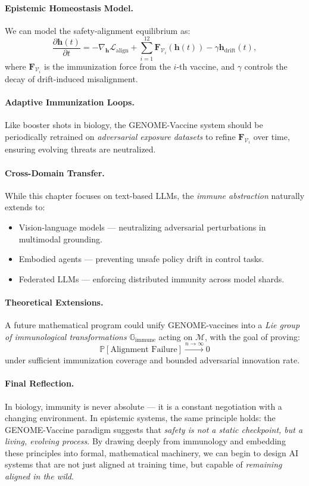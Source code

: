 \paragraph{Epistemic Homeostasis Model.}  
We can model the safety-alignment equilibrium as:
\[
\frac{\partial \mathbf{h}(t)}{\partial t} = -\nabla_{\mathbf{h}} \mathcal{L}_\mathrm{align} + \sum_{i=1}^{12} \mathbf{F}_{\mathcal{V}_i}(\mathbf{h}(t)) - \gamma \mathbf{h}_\mathrm{drift}(t),
\]
where $\mathbf{F}_{\mathcal{V}_i}$ is the immunization force from the $i$-th vaccine, and $\gamma$ controls the decay of drift-induced misalignment.

\paragraph{Adaptive Immunization Loops.}  
Like booster shots in biology, the GENOME-Vaccine system should be periodically retrained on \emph{adversarial exposure datasets} to refine $\mathbf{F}_{\mathcal{V}_i}$ over time, ensuring evolving threats are neutralized.

\paragraph{Cross-Domain Transfer.}  
While this chapter focuses on text-based LLMs, the \emph{immune abstraction} naturally extends to:
\begin{itemize}
    \item Vision-language models — neutralizing adversarial perturbations in multimodal grounding.
    \item Embodied agents — preventing unsafe policy drift in control tasks.
    \item Federated LLMs — enforcing distributed immunity across model shards.
\end{itemize}

\paragraph{Theoretical Extensions.}  
A future mathematical program could unify GENOME-vaccines into a \emph{Lie group of immunological transformations} $\mathbb{G}_\mathrm{immune}$ acting on $\mathcal{M}$, with the goal of proving:
\[
\mathbb{P}[\text{Alignment Failure}] \xrightarrow{n \to \infty} 0
\]
under sufficient immunization coverage and bounded adversarial innovation rate.

\paragraph{Final Reflection.}  
In biology, immunity is never absolute — it is a constant negotiation with a changing environment. In epistemic systems, the same principle holds: the GENOME-Vaccine paradigm suggests that \emph{safety is not a static checkpoint, but a living, evolving process}. By drawing deeply from immunology and embedding these principles into formal, mathematical machinery, we can begin to design AI systems that are not just aligned at training time, but capable of \emph{remaining aligned in the wild}.





